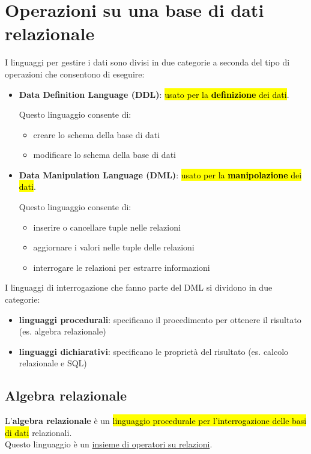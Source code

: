 \documentclass[12pt, a4paper, oneside]{book}
\begin{document}
    \chapter{Operazioni su una base di dati relazionale}
    I linguaggi per gestire i dati sono divisi in due categorie a seconda del tipo di operazioni che consentono di eseguire:
    \begin{itemize}[label=$\diamond$]
      \item \textcolor{azzurrino}{\textbf{Data Definition Language (DDL)}}: \hl{usato per la \textbf{definizione} dei dati}.
      
      Questo linguaggio consente di:
      \begin{itemize}[label=$\circ$]
        \item creare lo schema della base di dati
        \smallskip
        \item modificare lo schema della base di dati
      \end{itemize}
      \medskip
      \item \textcolor{azzurrino}{\textbf{Data Manipulation Language (DML)}}: \hl{usato per la \textbf{manipolazione} dei dati}.
      
      Questo linguaggio consente di:
      \begin{itemize}[label=$\circ$]
        \item inserire o cancellare tuple nelle relazioni
        \smallskip
        \item aggiornare i valori nelle tuple delle relazioni
        \smallskip
        \item interrogare le relazioni per estrarre informazioni
      \end{itemize}
    \end{itemize}

    \medskip

    I linguaggi di interrogazione che fanno parte del DML si dividono in due categorie:
    \begin{itemize}[label=$\triangleright$]
      \item \textbf{linguaggi procedurali}: specificano il procedimento per ottenere il risultato (es. algebra relazionale)
      \medskip
      \item \textbf{linguaggi dichiarativi}: specificano le proprietà del risultato (es. calcolo relazionale e SQL)
    \end{itemize}

    \section{Algebra relazionale}
    L’\textcolor{azzurrino}{\textbf{algebra relazionale}} è un \hl{linguaggio procedurale per l’interrogazione delle basi di dati} relazionali.\\[0.2ex] 
    Questo linguaggio è un \underline{insieme di operatori su relazioni}.
\end{document}
